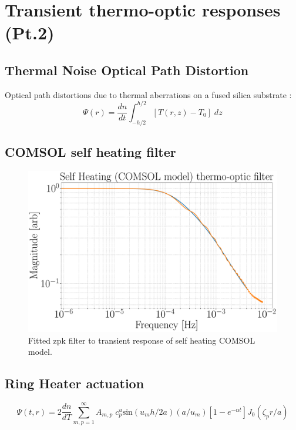 \newpage

\section{Transient thermo-optic responses (Pt.2)}\label{sec:TO_filt}
\subsection{Thermal Noise Optical Path Distortion}
Optical path distortions due to thermal aberrations on a fused silica substrate \cite{hellovinet:1990}:
\begin{equation}
    \Psi(r) = \frac{dn}{dt} \int^{h/2}_{-h/2} [T(r,z) - T_0] \;dz
\end{equation}
\subsection{COMSOL self heating filter}
\begin{figure}[H]
\includegraphics[width=\textwidth]{figs/TCS/self_heating_zpk.pdf}
\caption{Fitted zpk filter to transient response of self heating COMSOL model.}
\label{fig:self_zpk_fit}
\end{figure}

\subsection{Ring Heater actuation}

\begin{equation}
	\Psi(t,r)=2\frac{dn}{dT} \sum^{\infty}_{m,p = 1} A_{m,p} \; c^{u}_{p} \mathrm{sin}(u_m h /2a) (a/u_m)[1-e^{-\alpha t}] J_0(\zeta_p r/a)
\end{equation}

